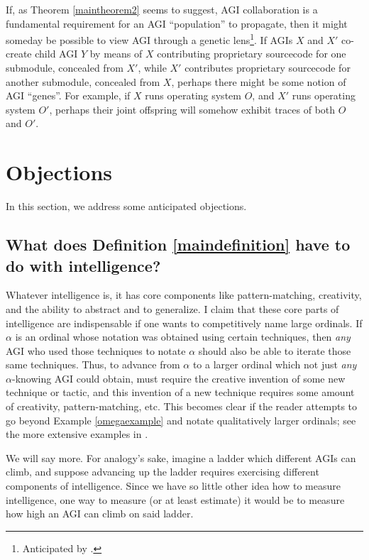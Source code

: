 \documentclass[runningheads]{llncs}
\begin{document}
If, as Theorem \ref{maintheorem2} seems to suggest, AGI collaboration
is a fundamental requirement for an AGI ``population'' to propagate, then it might
someday be possible to view AGI through a genetic lens\footnote{Anticipated
by \cite{buchanan1988artificial}.}. If AGIs $X$ and $X'$ co-create child AGI $Y$ by
means of $X$ contributing proprietary sourcecode for one submodule, concealed from $X'$,
while $X'$ contributes proprietary sourcecode for another submodule, concealed from $X$,
perhaps there might be some notion of AGI ``genes''. For example, if $X$ runs operating
system $O$, and $X'$ runs operating system $O'$, perhaps their joint offspring
will somehow exhibit traces of both $O$ and $O'$.


\section{Objections}
\label{objectionsection}

In this section, we address some anticipated objections.

\subsection{What does Definition \ref{maindefinition} have to do with intelligence?}

Whatever intelligence is, it has core components like pattern-matching,
creativity, and the ability to abstract and to generalize.
I claim that these core parts of intelligence are indispensable if one wants to
competitively name large ordinals. If $\alpha$ is an ordinal whose
notation was obtained using certain techniques, then \emph{any} AGI who used those
techniques to notate $\alpha$ should also be able to iterate those same techniques.
Thus, to advance from
$\alpha$ to a larger ordinal which not just \emph{any} $\alpha$-knowing
AGI could obtain, must require the creative invention of some new technique or tactic, and
this invention of a new technique requires some amount of creativity,
pattern-matching, etc. This becomes clear if the reader attempts to
go beyond Example \ref{omegaexample} and notate qualitatively larger ordinals;
see the more extensive examples in \cite{alexander2019measuring}.

We will say more.
For analogy's sake, imagine a ladder which different AGIs
can climb, and suppose advancing up the ladder requires exercising different
components of intelligence. Since we have so little other idea how to measure
intelligence, one way to measure (or at least estimate) it would be
to measure how high an AGI can climb on said ladder.
\end{document}
